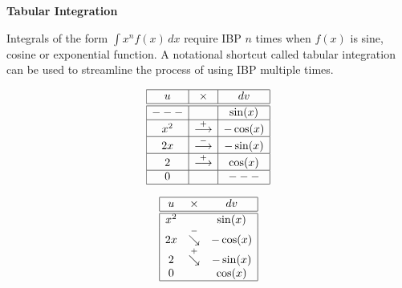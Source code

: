 \documentclass{ximera}
\begin{document}
\begin{center}
\textbf{Tabular Integration}
\end{center}

Integrals of the form $\int x^n f(x) \,dx$ require IBP $n$ times when $f(x)$ is sine, cosine or exponential function.
A notational shortcut called tabular integration can be used to streamline the process of using IBP multiple times.



\[
\begin{array}{|c|c|c|}\hline
 u & \times & dv \\ \hline \hline
  --- &  & \sin(x) \\ \hline
  x^2 & \overset{+}{\longrightarrow} & -\cos(x) \\ \hline
  2x &  \overset{-}{\longrightarrow} & -\sin(x) \\ \hline
  2 &  \overset{+}{\longrightarrow}  & \cos(x) \\ \hline
  0 &    & --- \\ \hline
\end{array}
\]

\[
\begin{array}{|ccc|}\hline
 u & \times & dv \\ \hline \hline
  x^2 & & \sin(x) \\ 
  2x & \overset{-}{\searrow} & -\cos(x) \\ 
  2 & \overset{+}{\searrow}  & -\sin(x) \\ 
  0 &    & \cos(x) \\ \hline
 
\end{array}
\]

\end{document}
